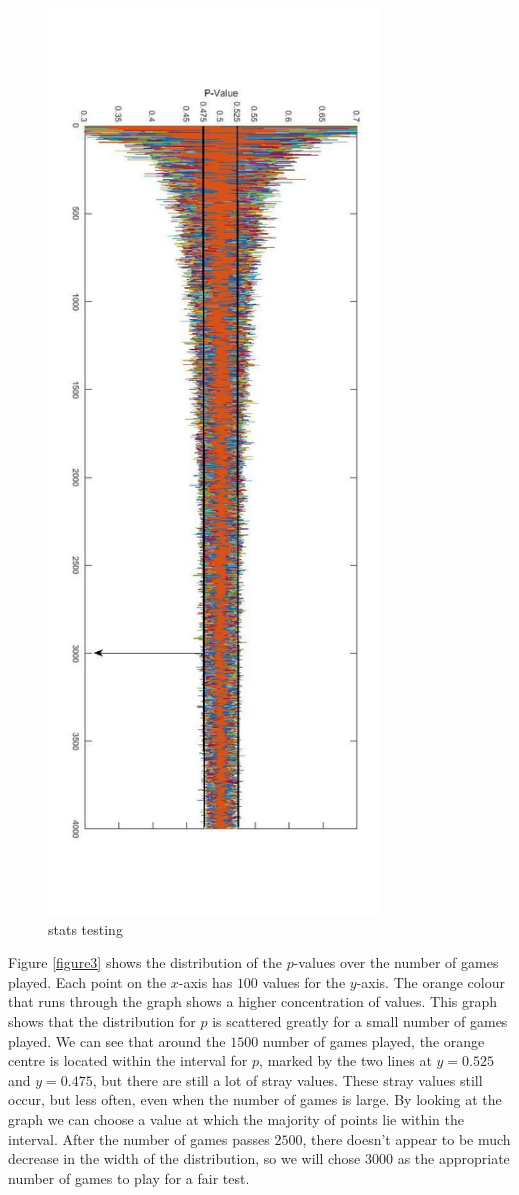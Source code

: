 \documentclass[a4paper,titlepage]{article}
\begin{document}
\begin{figure}
\centering
\includegraphics[height=24cm]{stats_testing}
\caption{stats testing\label{figure4}}
\end{figure}
Figure \ref{figure3} shows the distribution of the $p$-values over the number of games played. Each point on the $x$-axis has $100$ values for the $y$-axis. The orange colour that runs through the graph shows a higher concentration of values. This graph shows that the distribution for $p$ is scattered greatly for a small number of games played. We can see that around the $1500$ number of games played, the orange centre is located within the interval for $p$, marked by the two lines at $y=0.525$ and $y=0.475$, but there are still a lot of stray values. These stray values still occur, but less often, even when the number of games is large. By looking at the graph we can choose a value at which the majority of points lie within the interval. After the number of games passes $2500$, there doesn’t appear to be much decrease in the width of the distribution, so we will chose $3000$ as the appropriate number of games to play for a fair test.
\end{document}
